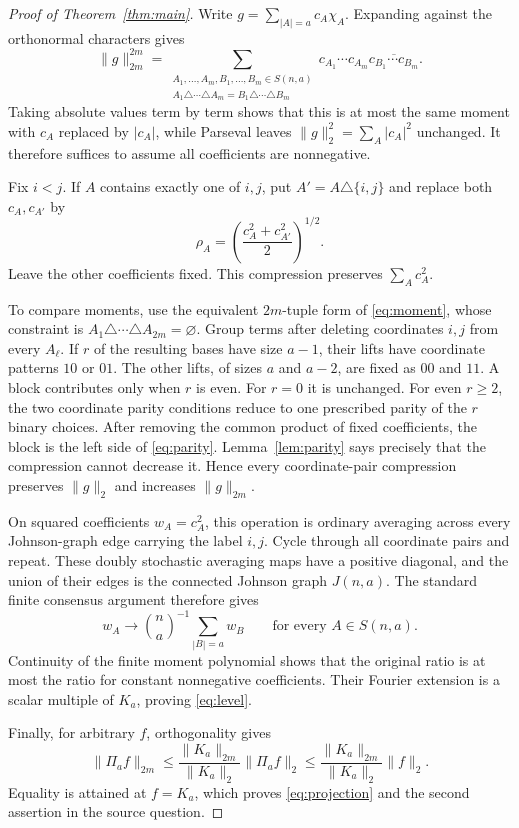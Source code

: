 \documentclass[11pt]{article}
\begin{document}
\begin{proof}[Proof of Theorem~\ref{thm:main}]
Write $g=\sum_{|A|=a}c_A\chi_A$.  Expanding against the orthonormal
characters gives
\begin{equation}\label{eq:moment}
 \|g\|_{2m}^{2m}
 =\sum_{\substack{A_1,\ldots,A_m,B_1,\ldots,B_m\in S(n,a)\\
 A_1\triangle\cdots\triangle A_m
 =B_1\triangle\cdots\triangle B_m}}
 c_{A_1}\cdots c_{A_m}
 \overline{c_{B_1}\cdots c_{B_m}}.
\end{equation}
Taking absolute values term by term shows that this is at most the same
moment with $c_A$ replaced by $|c_A|$, while Parseval leaves
$\|g\|_2^2=\sum_A|c_A|^2$ unchanged.  It therefore suffices to assume
all coefficients are nonnegative.

Fix $i<j$.  If $A$ contains exactly one of $i,j$, put
$A'=A\triangle\{i,j\}$ and replace both $c_A,c_{A'}$ by
\[
 \rho_A=\left(\frac{c_A^2+c_{A'}^2}{2}\right)^{1/2}.
\]
Leave the other coefficients fixed.  This compression preserves
$\sum_Ac_A^2$.

To compare moments, use the equivalent $2m$-tuple form of
\eqref{eq:moment}, whose constraint is
$A_1\triangle\cdots\triangle A_{2m}=\varnothing$.  Group terms after
deleting coordinates $i,j$ from every $A_\ell$.  If $r$ of the
resulting bases have size $a-1$, their lifts have coordinate patterns
$10$ or $01$.  The other lifts, of sizes $a$ and $a-2$, are fixed
as $00$ and $11$.  A block contributes only when $r$ is even.  For
$r=0$ it is unchanged.  For even $r\geq2$, the two coordinate parity
conditions reduce to one prescribed parity of the $r$ binary choices.
After removing the common product of fixed coefficients, the block is the
left side of \eqref{eq:parity}.  Lemma~\ref{lem:parity} says precisely that
the compression cannot decrease it.  Hence every coordinate-pair
compression preserves $\|g\|_2$ and increases $\|g\|_{2m}$.

On squared coefficients $w_A=c_A^2$, this operation is ordinary averaging
across every Johnson-graph edge carrying the label $i,j$.  Cycle through
all coordinate pairs and repeat.  These doubly stochastic averaging maps
have a positive diagonal, and the union of their edges is the connected
Johnson graph $J(n,a)$.  The standard finite consensus argument therefore
gives
\[
 w_A\longrightarrow \binom na^{-1}\sum_{|B|=a}w_B
 \qquad\text{for every }A\in S(n,a).
\]
Continuity of the finite moment polynomial shows that the original ratio is
at most the ratio for constant nonnegative coefficients.  Their Fourier
extension is a scalar multiple of $K_a$, proving \eqref{eq:level}.

Finally, for arbitrary $f$, orthogonality gives
\[
 \|\Pi_af\|_{2m}
 \leq \frac{\|K_a\|_{2m}}{\|K_a\|_2}\|\Pi_af\|_2
 \leq \frac{\|K_a\|_{2m}}{\|K_a\|_2}\|f\|_2.
\]
Equality is attained at $f=K_a$, which proves \eqref{eq:projection} and
the second assertion in the source question.
\end{proof}
\end{document}
